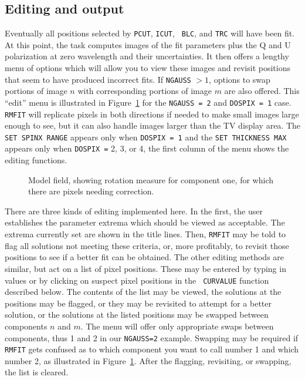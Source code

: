\documentclass[twoside]{article}
\newcommand{\putfig}[1]{\texttt{[image: \#1.eps]}}
\begin{document}
\vfill\eject
\subsection{Editing and output}

Eventually all positions selected by {\tt PCUT}, {\tt ICUT}, {\tt
  BLC}, and {\tt TRC} will have been fit.  At this point, the task
computes images of the fit parameters plus the Q and U polarization at
zero wavelength and their uncertainties.  It then offers a lengthy
menu of options which will allow you to view these images and revisit
positions that seem to have produced incorrect fits.  If {\tt NGAUSS}
$> 1$, options to swap portions of image $n$ with corresponding
portions of image $m$ are also offered.  This ``edit'' menu is
illustrated in Figure~\ref{fig:RMFIT.edit2} for the {\tt NGAUSS = 2}
and {\tt DOSPIX = 1} case.  {\tt RMFIT} will replicate pixels in both
directions if needed to make small images large enough to see, but it
can also handle images larger than the TV display area.  The {\tt SET
  SPINX RANGE} appears only when {\tt DOSPIX = 1} and the {\tt SET
  THICKNESS MAX} appears only when {\tt DOSPIX =} 2, 3, or 4, the
first column of the menu shows the editing functions.

\begin{figure}
\begin{center}
\resizebox{6.0in}{!}{\putfig{RMFIT.edit2}}
\caption{Model field, showing rotation measure for component one, for
which there are pixels needing correction.}
\label{fig:RMFIT.edit2}
\end{center}
\end{figure}

There are three kinds of editing implemented here.  In the first, the
user establishes the parameter extrema which should be viewed as
acceptable.  The extrema currently set are shown in the title lines.
Then, {\tt RMFIT} may be told to flag all solutions not meeting these
criteria, or, more profitably, to revisit those positions to see if a
better fit can be obtained.  The other editing methods are similar,
but act on a list of pixel positions.  These may be entered by typing
in values or by clicking on suspect pixel positions in the {\tt
  CURVALUE} function described below.  The contents of the list may be
viewed, the solutions at the positions may be flagged, or they may be
revisited to attempt for a better solution, or the solutions at the
listed positions may be swapped between components $n$ and $m$.  The
menu will offer only appropriate swaps between components, thus 1 and
2 in our {\tt NGAUSS=2} example.  Swapping may be required if {\tt
  RMFIT} gets confused as to which component you want to call number 1
and which number 2, as illustrated in Figure~\ref{fig:RMFIT.edit2}.
After the flagging, revisiting, or swapping, the list is cleared.
\vfill\eject
\end{document}
